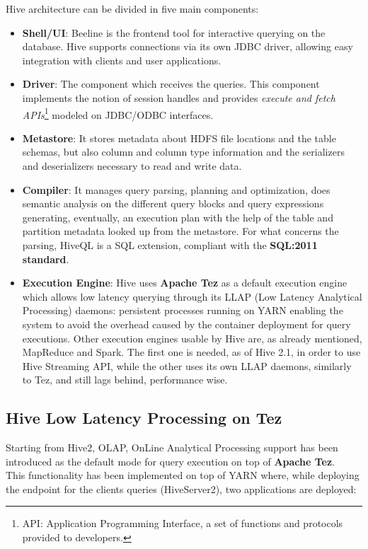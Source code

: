 Hive architecture can be divided in five main components:

\begin{itemize}
    \item \textbf{Shell/UI}: Beeline is the frontend tool for interactive querying on the database. Hive supports connections via its own JDBC driver, allowing easy integration with clients and user applications.
    \item \textbf{Driver}: The component which receives the queries. This component implements the notion of session handles and provides \textit{execute and fetch APIs}\footnote{API: Application Programming Interface, a set of functions and protocols provided to developers.} modeled on JDBC/ODBC interfaces.
    \item \textbf{Metastore}: It stores metadata about HDFS file locations and the table schemas, but also column and column type information and the serializers and deserializers necessary to read and write data.
    \item \textbf{Compiler}: It manages query parsing, planning and optimization, does semantic analysis on the different query blocks and query expressions generating, eventually, an execution plan with the help of the table and partition metadata looked up from the metastore. For what concerns the parsing, HiveQL is a SQL extension, compliant with the \textbf{SQL:2011 standard}.
    \item \textbf{Execution Engine}: Hive uses \textbf{Apache Tez} as a default execution engine  which allows low latency querying through its LLAP (Low Latency Analytical Processing) daemons: persistent processes running on YARN enabling the system to avoid the overhead caused by the container deployment for query executions. Other execution engines usable by Hive are, as already mentioned, MapReduce and Spark. The first one is needed, as of Hive 2.1, in order to use Hive Streaming API, while the other uses its own LLAP daemons, similarly to Tez, and still lags behind, performance wise.
\end{itemize}

\subsection{Hive Low Latency Processing on Tez}

Starting from Hive2, OLAP, OnLine Analytical Processing support has been introduced as the default mode for query execution on top of \textbf{Apache Tez}.\\  
This functionality has been implemented on top of YARN where, while deploying the endpoint for the clients queries (HiveServer2), two applications are deployed: 

